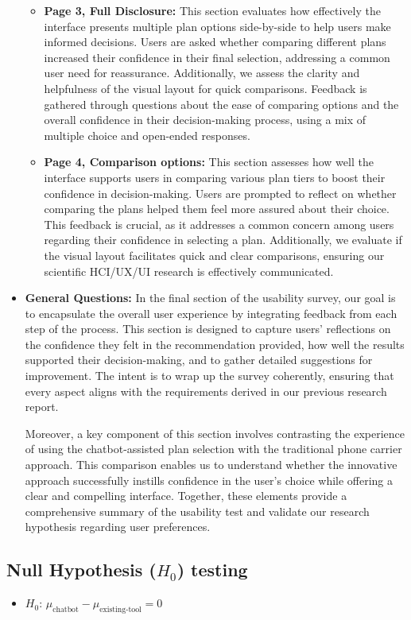 \documentclass[conference]{IEEEtran}
\begin{document}
\begin{itemize}
\begin{itemize}
        \item \textbf{Page 3, Full Disclosure:} This section evaluates how effectively the interface presents multiple plan options side-by-side to help users make informed decisions. Users are asked whether comparing different plans increased their confidence in their final selection, addressing a common user need for reassurance. Additionally, we assess the clarity and helpfulness of the visual layout for quick comparisons. Feedback is gathered through questions about the ease of comparing options and the overall confidence in their decision-making process, using a mix of multiple choice and open-ended responses.
        \item \textbf{Page 4, Comparison options:}  This section assesses how well the interface supports users in comparing various plan tiers to boost their confidence in decision-making. Users are prompted to reflect on whether comparing the plans helped them feel more assured about their choice. This feedback is crucial, as it addresses a common concern among users regarding their confidence in selecting a plan. Additionally, we evaluate if the visual layout facilitates quick and clear comparisons, ensuring our scientific HCI/UX/UI research is effectively communicated.
    \end{itemize}
    \item \textbf{General Questions:} In the final section of the usability survey, our goal is to encapsulate the overall user experience by integrating feedback from each step of the process. This section is designed to capture users' reflections on the confidence they felt in the recommendation provided, how well the results supported their decision-making, and to gather detailed suggestions for improvement. The intent is to wrap up the survey coherently, ensuring that every aspect aligns with the requirements derived in our previous research report.

Moreover, a key component of this section involves contrasting the experience of using the chatbot-assisted plan selection with the traditional phone carrier approach. This comparison enables us to understand whether the innovative approach successfully instills confidence in the user’s choice while offering a clear and compelling interface. Together, these elements provide a comprehensive summary of the usability test and validate our research hypothesis regarding user preferences.
\end{itemize}
\subsection{Null Hypothesis ($H_0$) testing}
\begin{itemize}
\item $H_0$: $\mu_{\text{chatbot}} - \mu_{\text{existing-tool}} = 0$
\end{itemize}
\end{document}
